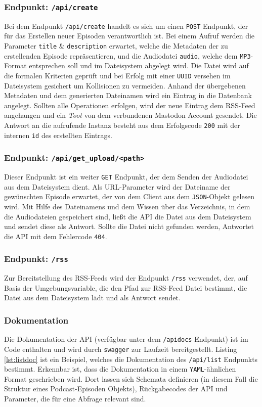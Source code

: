 \documentclass{article}
\begin{document}
\subsubsection{Endpunkt: \texttt{/api/create}}
Bei dem Endpunkt \texttt{/api/create} handelt es sich um einen \texttt{POST} Endpunkt, der für das Erstellen neuer Episoden verantwortlich ist. Bei einem Aufruf werden die Parameter \texttt{title} \& \texttt{description} erwartet, welche die Metadaten der zu erstellenden Episode repräsentieren, und die Audiodatei \texttt{audio}, welche dem \texttt{MP3}-Format entsprechen soll und im Dateisystem abgelegt wird. Die Datei wird auf die formalen Kriterien geprüft und bei Erfolg mit einer \texttt{UUID} versehen im Dateisystem gesichert um Kollisionen zu vermeiden. Anhand der übergebenen Metadaten und dem generierten Dateinamen wird ein Eintrag in die Datenbank angelegt. Sollten alle Operationen erfolgen, wird der neue Eintrag dem RSS-Feed angehangen und ein \textit{Toot} von dem verbundenen Mastodon Account gesendet. Die Antwort an die aufrufende Instanz besteht aus dem Erfolgscode \texttt{200} mit der internen \texttt{id} des erstellten Eintrags.

\subsubsection{Endpunkt: \texttt{/api/get\_upload/<path>}}
Dieser Endpunkt ist ein weiter \texttt{GET} Endpunkt, der dem Senden der Audiodatei aus dem Dateisystem dient. Als URL-Parameter wird der Dateiname der gewünschten Episode erwartet, der von dem Client aus dem \texttt{JSON}-Objekt gelesen wird. Mit Hilfe des Dateinamens und dem Wissen über das Verzeichnis, in dem die Audiodateien gespeichert sind, ließt die API die Datei aus dem Dateisystem und sendet diese als Antwort. Sollte die Datei nicht gefunden werden, Antwortet die API mit dem Fehlercode \texttt{404}.

\subsubsection{Endpunkt: \texttt{/rss}}
Zur Bereitstellung des RSS-Feeds wird der Endpunkt \texttt{/rss} verwendet, der, auf Basis der Umgebungsvariable, die den Pfad zur RSS-Feed Datei bestimmt, die Datei aus dem Dateisystem lädt und als Antwort sendet.

\subsubsection{Dokumentation}
Die Dokumentation der API (verfügbar unter dem \texttt{/apidocs} Endpunkt) ist im Code enthalten und wird durch \texttt{swagger} \cite{swagger} zur Laufzeit bereitgestellt. Listing \ref{lst:listdoc} ist ein Beispiel, welches die Dokumentation des \texttt{/api/list} Endpunkts bestimmt. Erkennbar ist, dass die Dokumentation in einem \texttt{YAML}-ähnlichen Format geschrieben wird. Dort lassen sich Schemata definieren (in diesem Fall die Struktur eines Podcast-Episoden Objekts), Rückgabecodes der API und Parameter, die für eine Abfrage relevant sind.
\end{document}
